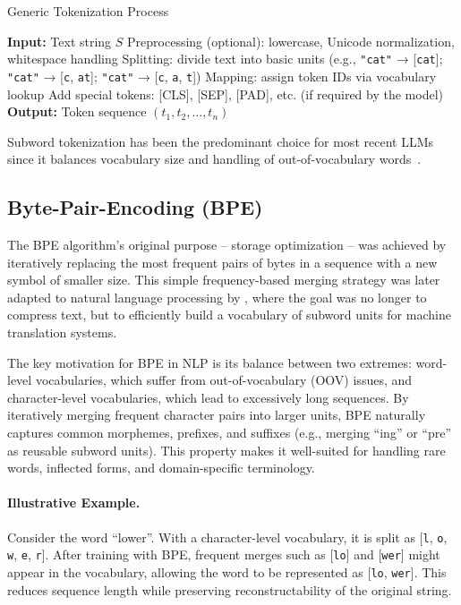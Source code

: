 \begin{algorithm}[H]
\caption{Generic Tokenization Process}
\begin{algorithmic}[1]
\State \textbf{Input:} Text string $S$
\State Preprocessing (optional): lowercase, Unicode normalization, whitespace handling
\State Splitting: divide text into basic units (e.g., \texttt{"cat"} → [\texttt{cat}]; \texttt{"cat"} → [\texttt{c}, \texttt{at}]; \texttt{"cat"} → [\texttt{c}, \texttt{a}, \texttt{t}])
\State Mapping: assign token IDs via vocabulary lookup
\State Add special tokens: [CLS], [SEP], [PAD], etc. (if required by the model)
\State \textbf{Output:} Token sequence $(t_1, t_2, \dots, t_n)$
\end{algorithmic}
\end{algorithm}


Subword tokenization has been the predominant choice for most recent LLMs since it balances vocabulary size and handling of out-of-vocabulary words~\cite{sennrich2015neural, wu2016google, kudo2018sentencepiece, bostrom2020byte}.

\subsection{Byte-Pair-Encoding (BPE)}\label{Section2.1.2}\label{subsec:byte-pair-encoding_bpe}
    The BPE algorithm’s original purpose -- storage optimization -- was achieved by iteratively replacing the most frequent pairs of bytes in a sequence with a new symbol of smaller size. This simple frequency-based merging strategy was later adapted to natural language processing by \citet{sennrich2015neural}, where the goal was no longer to compress text, but to efficiently build a vocabulary of subword units for machine translation systems.
    
    The key motivation for BPE in NLP is its balance between two extremes: word-level vocabularies, which suffer from out-of-vocabulary (OOV) issues, and character-level vocabularies, which lead to excessively long sequences. By iteratively merging frequent character pairs into larger units, BPE naturally captures common morphemes, prefixes, and suffixes (e.g., merging ``ing'' or ``pre'' as reusable subword units). This property makes it well-suited for handling rare words, inflected forms, and domain-specific terminology.
    
    \paragraph{Illustrative Example.}
    Consider the word “lower”. With a character-level vocabulary, it is split as [\texttt{l}, \texttt{o}, \texttt{w}, \texttt{e}, \texttt{r}]. After training with BPE, frequent merges such as [\texttt{lo}] and [\texttt{wer}] might appear in the vocabulary, allowing the word to be represented as [\texttt{lo}, \texttt{wer}]. This reduces sequence length while preserving reconstructability of the original string.
    

